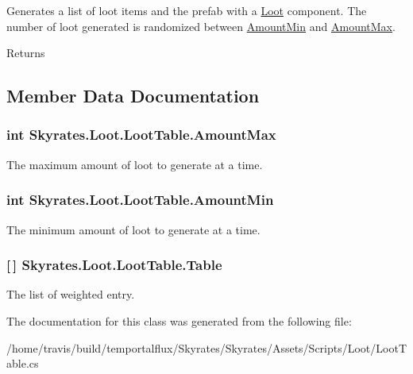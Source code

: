 Generates a list of loot items and the prefab with a \hyperlink{class_skyrates_1_1_loot_1_1_loot}{Loot} component. The number of loot generated is randomized between \hyperlink{class_skyrates_1_1_loot_1_1_loot_table_a9ef0cb4eba51c0a7b2fb4a5fa507ee69}{Amount\-Min} and \hyperlink{class_skyrates_1_1_loot_1_1_loot_table_adb27de9ece245e9a29e96c68e267343b}{Amount\-Max}. 

\begin{DoxyReturn}{Returns}

\end{DoxyReturn}


\subsection{Member Data Documentation}
\hypertarget{class_skyrates_1_1_loot_1_1_loot_table_adb27de9ece245e9a29e96c68e267343b}{
\subsubsection[{Amount\-Max}]{\setlength{\rightskip}{0pt plus 5cm}int Skyrates.\-Loot.\-Loot\-Table.\-Amount\-Max}}\label{class_skyrates_1_1_loot_1_1_loot_table_adb27de9ece245e9a29e96c68e267343b}


The maximum amount of loot to generate at a time. 

\hypertarget{class_skyrates_1_1_loot_1_1_loot_table_a9ef0cb4eba51c0a7b2fb4a5fa507ee69}{
\subsubsection[{Amount\-Min}]{\setlength{\rightskip}{0pt plus 5cm}int Skyrates.\-Loot.\-Loot\-Table.\-Amount\-Min}}\label{class_skyrates_1_1_loot_1_1_loot_table_a9ef0cb4eba51c0a7b2fb4a5fa507ee69}


The minimum amount of loot to generate at a time. 

\hypertarget{class_skyrates_1_1_loot_1_1_loot_table_a02144c6a002bd609a0e53410466a1bc8}{
\subsubsection[{Table}]{ \mbox{[}$\,$\mbox{]} Skyrates.\-Loot.\-Loot\-Table.\-Table}}\label{class_skyrates_1_1_loot_1_1_loot_table_a02144c6a002bd609a0e53410466a1bc8}


The list of weighted entry. 



The documentation for this class was generated from the following file\-:\begin{DoxyCompactItemize}
\item 
/home/travis/build/temportalflux/\-Skyrates/\-Skyrates/\-Assets/\-Scripts/\-Loot/Loot\-Table.\-cs\end{DoxyCompactItemize}
